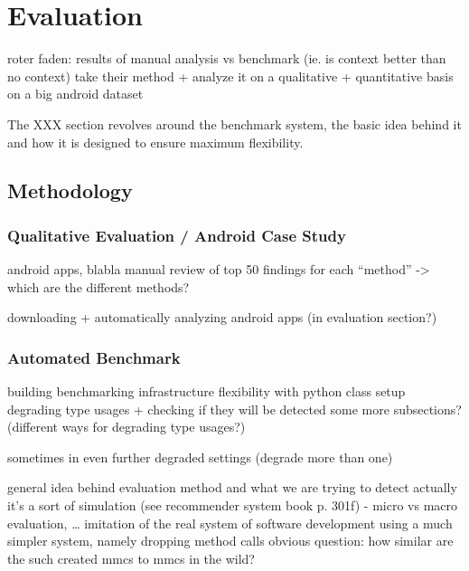 \chapter{Evaluation}\label{ch:eval}
roter faden: results of manual analysis vs benchmark (ie. is context better than no context)
take their method + analyze it on a qualitative + quantitative basis on a big android dataset

The XXX section revolves around the benchmark system, the basic idea behind it and how it is designed to ensure maximum flexibility.


\section{Methodology}

\subsection{Qualitative Evaluation / Android Case Study}
android apps, blabla
manual review of top 50 findings for each ``method''
-> which are the different methods?

downloading + automatically analyzing android apps (in evaluation section?)

\subsection{Automated Benchmark}

building benchmarking infrastructure
flexibility with python class setup
degrading type usages + checking if they will be detected
    some more subsections? (different ways for degrading type usages?)

sometimes in even further degraded settings (degrade more than one)

general idea behind evaluation method and what we are trying to detect
actually it's a sort of simulation (see recommender system book p. 301f) - micro vs macro evaluation, \ldots
    imitation of the real system of software development
    using a much simpler system, namely dropping method calls
    obvious question: how similar are the such created mmcs to mmcs in the wild?

